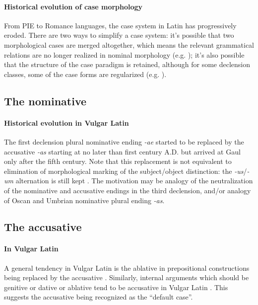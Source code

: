 \documentclass[a4paper, oneside, 12pt]{report}
\newcommand*{\citepage}[1]{p.~{#1}}
\newcommand{\form}[1]{\emph{#1}}
\begin{document}
\paragraph*{Historical evolution of case morphology}
From PIE to Romance languages, the case system in Latin has progressively eroded.
There are two ways to simplify a case system:
it's possible that two morphological cases are merged altogether,
which means the relevant grammatical relations are no longer realized in nominal morphology
(e.g. );
it's also possible that the structure of the case paradigm is retained,
although for some declension classes,
some of the case forms are regularized
(e.g. ).


\subsection{The nominative}

\paragraph*{Historical evolution in Vulgar Latin}
\label{sec:noun.case.nominative.vulgar}
The first declension plural nominative ending \form{-ae}
started to be replaced by the accusative \form{-as} starting at no later than first century A.D.
but arrived at Gaul only after the fifth century.
Note that this replacement is not equivalent to elimination of
morphological marking of the subject/object distinction:
the \form{-us}/\form{-um} alternation is still kept
\citep[\citepage{55}]{herman2010vulgar}.
The motivation may be analogy of the neutralization 
of the nominative and accusative endings in the third declension,
and/or analogy of Oscan and Umbrian nominative plural ending \form{-as}.

\subsection{The accusative}

\paragraph*{In Vulgar Latin}
\label{sec:noun.case.accusative.vulgar}
A general tendency in Vulgar Latin is the ablative in prepositional constructions 
being replaced by the accusative \citep[\citepage{53}]{herman2010vulgar}.
Similarly, internal arguments which should be genitive or dative or ablative
tend to be accusative in Vulgar Latin
\citep[\citepage{54}]{herman2010vulgar}.
This suggests the accusative being recognized as the ``default case''.
\end{document}
